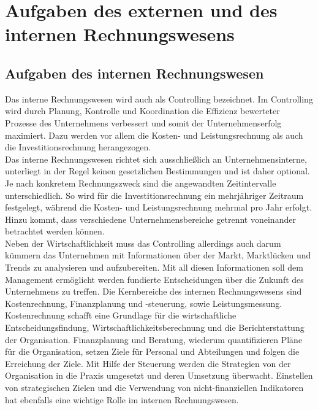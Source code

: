 %
\section{Aufgaben des externen und des internen Rechnungswesens}

\subsection{Aufgaben des internen Rechnungswesen}
Das interne Rechnungswesen wird auch als Controlling bezeichnet. Im Controlling wird durch Planung, Kontrolle und Koordination die Effizienz bewerteter Prozesse des Unternehmens verbessert und somit der Unternehmenserfolg maximiert. Dazu werden vor allem die Kosten- und Leistungsrechnung als auch die Investitionsrechnung herangezogen.
\\
Das interne Rechnungswesen richtet sich ausschließlich an Unternehmensinterne, unterliegt in der Regel keinen gesetzlichen Bestimmungen und ist daher optional. Je nach konkretem Rechnungszweck sind die angewandten Zeitintervalle unterschiedlich. So wird für die Investitionsrechnung ein mehrjähriger Zeitraum festgelegt, während die Kosten- und Leistungsrechnung mehrmal pro Jahr erfolgt. Hinzu kommt, dass verschiedene Unternehmensbereiche getrennt voneinander betrachtet werden können.
\\
Neben der Wirtschaftlichkeit muss das Controlling allerdings auch darum kümmern das Unternehmen mit Informationen über der Markt, Marktlücken und Trends zu analysieren und aufzubereiten. Mit all diesen Informationen soll dem Management ermöglicht werden fundierte Entscheidungen über die Zukunft des Unternehmens zu treffen.
Die Kernbereiche des internen Rechnungswesens sind Kostenrechnung, Finanzplanung und -steuerung, sowie Leistungsmessung. 
\\
Kostenrechnung schafft eine Grundlage für die wirtschaftliche Entscheidungsfindung, Wirtschaftlichkeitsberechnung und die Berichterstattung der Organisation. Finanzplanung und Beratung, wiederum quantifizieren Pläne für die Organisation, setzen Ziele für Personal und Abteilungen und folgen die Erreichung der Ziele. Mit Hilfe der Steuerung werden die Strategien von der Organisation in die Praxis umgesetzt und deren Umsetzung überwacht. Einstellen von strategischen Zielen und die Verwendung von nicht-finanziellen Indikatoren hat ebenfalls eine wichtige Rolle im internen Rechnungswesen.\cite{madegowda2006}

